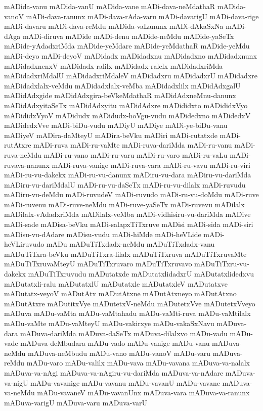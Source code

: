 {mADida-vanu
mADida-vanU
mADida-vane
mADi-dava-neMdathaR
mADida-vanoV
mADi-dava-ranunx
mADi-dava-rAda-varu
mADi-davarigU
mADi-dava-rige
mADi-davaru
mADi-dava-reMdu
mADida-vaLanunx
mADi-dAkaSxNa
mADi-dAga
mADi-diruva
mADide
mADi-denu
mADide-neMdu
mADide-yaSeTx
mADide-yAdadxriMda
mADide-yeMdare
mADide-yeMdathaR
mADide-yeMdu
mADi-deyo
mADi-deyoV
mADidadx
mADidadxnu
mADidadxno
mADidadxnunx
mADidadxnenxV
mADidadx-ralilx
mADidadx-ralelx
mADidadxriMda
mADidadxriMdalU
mADidadxriMdaleV
mADidadxru
mADidadxrU
mADidadxre
mADidadxlalx-veMdu
mADidadxlalx-veMba
mADidadxlilx
mADidAdxgalU
mADidAdxgide
mADidAdxgira-beVkeMdathaR
mADidAdxneMnu-danunx
mADidAdxyitaSeTx
mADidAdxyitu
mADidAdxre
mADididxto
mADididxVyo
mADididxVyoV
mADidudx
mADidudx-hoVgu-vudu
mADidedxno
mADidedxV
mADidedxVve
mADi-biDu-vudu
mADiyU
mADiye
mADi-ye-biDu-vanu
mADiyeV
mADira-daMteyU
mADira-beVku
mADiri
mADi-rutatxde
mADi-rutAtxre
mADi-ruva
mADi-ru-vaMte
mADi-ruva-dariMda
mADi-ru-vanu
mADi-ruva-neMdu
mADi-ru-vano
mADi-ru-varu
mADi-ru-varo
mADi-ru-vaLu
mADi-ruvava-nanunx
mADi-ruva-vanige
mADi-ruva-vara
mADi-ru-vavu
mADi-ru-viri
mADi-ru-vu-dakekx
mADi-ru-vu-danunx
mADiru-vu-dara
mADiru-vu-dariMda
mADiru-vu-dariMdalU
mADi-ru-vu-daSeTx
mADi-ru-vu-dilalx
mADi-ruvudu
mADiru-vu-deMdu
mADi-ruvudeV
mADi-ruvudo
mADi-ru-vu-doMdu
mADi-ruve
mADi-ruvenu
mADi-ruve-neMdu
mADi-ruve-yaSeTx
mADi-ruvevu
mADilalx
mADilalx-vAdadxriMda
mADilalx-veMba
mADi-vidhisiru-vu-dariMda
mADive
mADi-sade
mADisa-beVku
mADi-salapxTiTxruve
mADisi
mADi-sida
mADi-siri
mADisu-vu-dAdare
mADisu-vudu
mADi-hiMde
mADi-heVLide
mADi-heVLiruvudo
mADu
mADuTiTxdadx-neMdu
mADuTiTxdadx-vanu
mADuTiTxra-beVku
mADuTiTxra-lilalx
mADuTiTxruva
mADuTiTxruvaMte
mADuTiTxruvaMteyU
mADuTiTxruvaro
mADuTiTxruvavo
mADuTiTxru-vu-dakekx
mADuTiTxruvudu
mADutatxde
mADutatxlidadxrU
mADutatxlidedxvu
mADutatxli-ralu
mADutatxlU
mADutatxle
mADutatxleV
mADutatxve
mADutatx-veyoV
mADutAtx
mADutAtxne
mADutAtxneyo
mADutAtxno
mADutAtxre
mADutitxVye
mADutetxV-neMdu
mADutetxVve
mADutetxVveyo
mADuva
mADu-vaMta
mADu-vaMtahadu
mADu-vaMti-ruva
mADu-vaMtilalx
mADu-vaMte
mADu-vaMteyU
mADu-vakirxye
mADu-vakaSxNavu
mADuva-dara
mADuva-dariMda
mADuva-daSeTx
mADuva-dilalxvo
mADu-vadu
mADu-vade
mADuva-deMbudara
mADu-vado
mADu-vanige
mADu-vanu
mADuva-neMdu
mADuva-neMbudu
mADu-vano
mADu-vanoV
mADu-varu
mADuva-reMdu
mADu-varo
mADu-valilx
mADu-vava
mADu-vavana
mADuva-va-nalalx
mADuva-va-nAgi
mADuva-va-nAgiru-vu-dariMda
mADuva-va-nAdare
mADuva-va-nigU
mADu-vavanige
mADu-vavanu
mADu-vavanU
mADu-vavane
mADuva-va-neMdu
mADu-vavaneV
mADu-vavanUnx
mADuva-vara
mADuva-va-ranunx
mADuva-varigU
mADuva-varu
mADuva-varU
}

